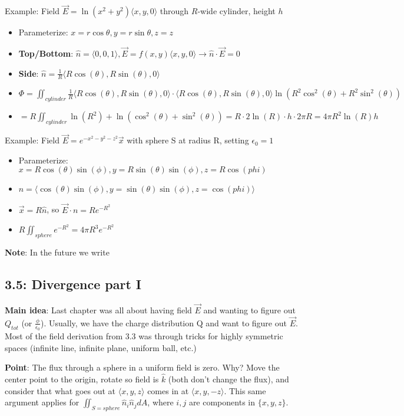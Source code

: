 \documentclass[11pt, oneside]{article}   	%
\begin{document}
Example: Field $\vec{E} = \ln(x^2 + y^2)\langle x, y, 0\rangle$ through $R$-wide cylinder, height $h$
\begin{itemize}
\item Parameterize: $x = r \cos \theta, y = r \sin \theta, z = z$
\item \textbf{Top/Bottom}: $\hat{n} = \langle 0, 0, 1 \rangle, \vec{E} = f(x,y) \langle x, y, 0\rangle \rightarrow \hat{n} \cdot \vec{E} = 0$
\item \textbf{Side}: $\hat{n} = \frac{1}{R} \langle R \cos (\theta), R \sin (\theta), 0 \rangle$
\item $\Phi = \iint_{cylinder} \frac{1}{R} \langle R \cos (\theta), R \sin (\theta), 0 \rangle \cdot  \langle R \cos (\theta), R \sin (\theta), 0 \rangle \ln(R^2 \cos^2(\theta) + R^2 \sin^2(\theta))$
\item $= R \iint_{cylinder} \ln(R^2) + \ln(\cos^2(\theta)+\sin^2(\theta)) = R \cdot 2 \ln (R) \cdot h \cdot 2 \pi R = 4 \pi R^2 \ln(R)h$
\end{itemize}

Example: Field $\vec{E} = e^{-x^2-y^2-z^2}\vec{x}$ with sphere S at radius R, setting $\epsilon_0 = 1$
\begin{itemize}
\item Parameterize: $x = R \cos (\theta)\sin(\phi), y = R\sin (\theta)\sin(\phi), z =R \cos(phi)$
\item $\hat{n} = \langle \cos (\theta)\sin(\phi), y =  \sin (\theta)\sin(\phi), z = \cos(phi) \rangle$
\item $\vec{x} = R \hat{n}$, so $\vec{E} \cdot {n} = R e^{-R^2}$
\item $R \iint_{sphere} e^{-R^2} = 4 \pi R^3 e^{-R^2}$
\end{itemize}

\textbf{Note}: In the future we write 

\subsection{3.5: Divergence part I}

\textbf{Main idea}: Last chapter was all about having field $\vec{E}$ and wanting to figure out $Q_{tot}$ (or $\frac{\phi}{\epsilon_0}$). Usually, we have the charge distribution Q and want to figure out $\vec{E}$.  Most of the field derivation from 3.3 was through tricks for highly symmetric spaces (infinite line, infinite plane, uniform ball, etc.)

\textbf{Point}: The flux through a sphere in a uniform field is zero.  Why?  Move the center point to the origin, rotate so field is $\hat{k}$ (both don't change the flux), and consider that what goes out at $\langle x, y, z \rangle$ comes in at $\langle x, y, -z \rangle$.  This same argument applies for $\iint_{S = sphere} \hat{n}_i \hat{n}_j dA$, where $i, j$ are components in $\{x, y, z\}$.
\end{document}
